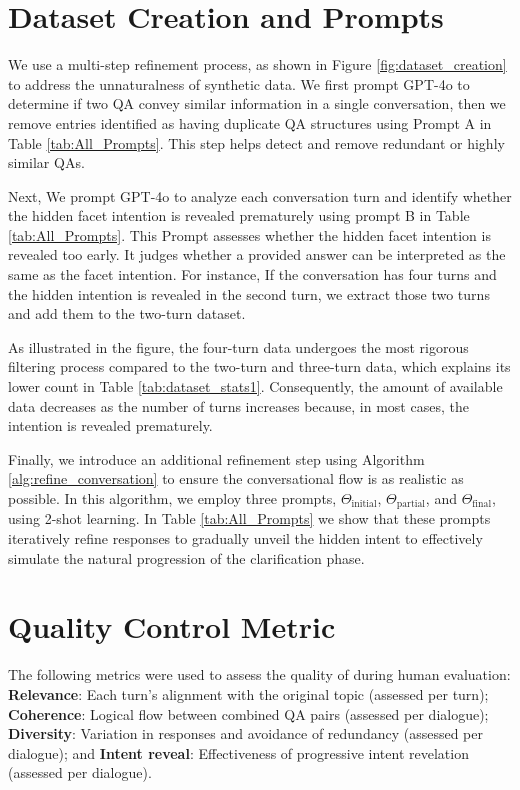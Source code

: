 \documentclass[11pt]{article}
\begin{document}




\appendix

\section{Dataset Creation and Prompts}
\label{sec:appendixA}

We use a multi-step refinement process, as shown in Figure \ref{fig:dataset_creation} to address the unnaturalness of synthetic data. We first prompt GPT-4o to determine if two QA convey similar information in a single conversation, then we remove entries identified as having duplicate QA structures using Prompt A in Table \ref{tab:All_Prompts}. This step helps detect and remove redundant or highly similar QAs.

Next, We prompt GPT-4o to analyze each conversation turn and identify whether the hidden facet intention is revealed prematurely using prompt B in Table \ref{tab:All_Prompts}. This Prompt assesses whether the hidden facet intention is revealed too early. It judges whether a provided answer can be interpreted as the same as the facet intention. For instance, If the conversation has four turns and the hidden intention is revealed in the second turn, we extract those two turns and add them to the two-turn dataset.

As illustrated in the figure, the four-turn data undergoes the most rigorous filtering process compared to the two-turn and three-turn data, which explains its lower count in Table \ref{tab:dataset_stats1}. Consequently, the amount of available data decreases as the number of turns increases because, in most cases, the intention is revealed prematurely.  

Finally, we introduce an additional refinement step using Algorithm \ref{alg:refine_conversation} to ensure the conversational flow is as realistic as possible. In this algorithm, we employ three prompts, $\Theta_{\text{initial}}$, $\Theta_{\text{partial}}$, and $\Theta_{\text{final}}$, using 2-shot learning. In Table \ref{tab:All_Prompts} we show that these prompts iteratively refine responses to gradually unveil the hidden intent to effectively simulate the natural progression of the clarification phase.






\section{Quality Control Metric}
\label{sec:appendix-quality}
The following metrics were used to assess the quality of \OurData{} during human evaluation: \textbf{Relevance}: Each turn's alignment with the original topic (assessed per turn); \textbf{Coherence}: Logical flow between combined QA pairs (assessed per dialogue); \textbf{Diversity}: Variation in responses and avoidance of redundancy (assessed per dialogue); and \textbf{Intent reveal}: Effectiveness of progressive intent revelation (assessed per dialogue).
\end{document}
